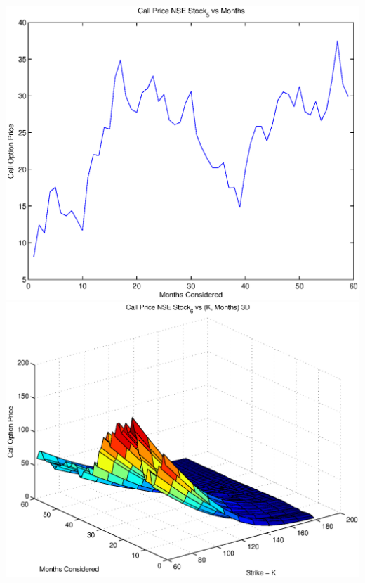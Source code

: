 \documentclass{article}
\begin{document}
\includegraphics[width=\textwidth]{Call_Price_NSE_Stock_5_vs_Months} \\

\includegraphics[width=\textwidth]{Call_Price_NSE_Stock_6_vs_(K,_Months)_3D} \\
\end{document}
